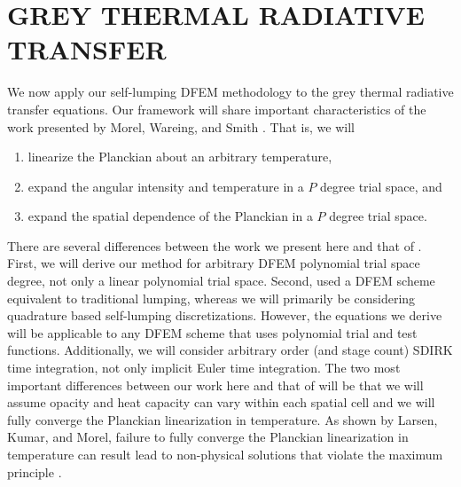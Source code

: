 %
%
%



\chapter{\uppercase{Grey Thermal Radiative Transfer}}
\label{sec:chapter6_grey_radtran}

We now apply our self-lumping DFEM methodology to the grey thermal radiative transfer equations.
Our framework will share important characteristics of the work presented by Morel, Wareing, and Smith \cite{morel_radtran}.
That is, we will
\begin{enumerate}
\item linearize the Planckian about an arbitrary temperature,
\item  expand the angular intensity and temperature in a $P$ degree trial space, and
\item expand the spatial dependence of the Planckian in a $P$ degree trial space.
\end{enumerate}
There are several differences between the work we present here and that of \cite{morel_radtran}.
First, we will derive our method for arbitrary DFEM polynomial trial space degree, not only a linear polynomial trial space.
Second, \cite{morel_radtran} used a DFEM scheme equivalent to traditional lumping, whereas we will primarily be considering quadrature based self-lumping discretizations.
However, the equations we derive will be applicable to any DFEM scheme that uses polynomial trial and test functions.
Additionally, we will consider arbitrary order (and stage count) SDIRK time integration, not only implicit Euler time integration.
The two most important differences between our work here and that of \cite{morel_radtran} will be that we will assume opacity and heat capacity can vary within each spatial cell and we will fully converge the Planckian linearization in temperature.
As shown by Larsen, Kumar, and Morel, failure to fully converge the Planckian linearization in temperature can result lead to non-physical solutions that violate the maximum principle \cite{larsen_trt}.

